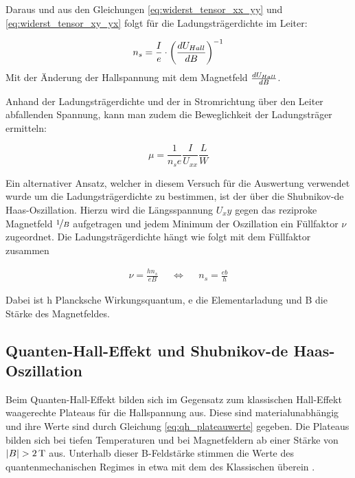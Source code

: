 Daraus und aus den Gleichungen \ref{eq:widerst_tensor_xx_yy} und \ref{eq:widerst_tensor_xy_yx} folgt für die Ladungsträgerdichte im Leiter:
 
 \begin{equation}
 n_s=\frac{I}{e} \cdot \left( \frac{d U_{Hall}}{d B} \right)^{-1}
 \label{eq:ladungsdichte_steig}
 \end{equation}
 Mit der Änderung der Hallspannung mit dem Magnetfeld $\frac{d U_{Hall}}{d B}$. 
 
 Anhand der Ladungsträgerdichte und der in Stromrichtung über den Leiter abfallenden Spannung, kann man zudem die Beweglichkeit der Ladungsträger ermitteln:
 
 \begin{equation}
 \mu=\frac{1}{n_se}\frac{I}{U_{xx}}\frac{L}{W}
 \label{eq:bewegl_masse}
 \end{equation}
 
 Ein alternativer Ansatz, welcher in diesem Versuch für die Auswertung verwendet wurde um die Ladungsträgerdichte zu bestimmen, ist der über die Shubnikov-de Haas-Oszillation. Hierzu wird die Längsspannung $U_xy$ gegen das reziproke Magnetfeld $\nicefrac{1}{B}$ aufgetragen und jedem Minimum der Oszillation ein Füllfaktor $\nu$ zugeordnet. Die Ladungsträgerdichte hängt wie folgt mit dem Füllfaktor zusammen
 
 \begin{align}
 	\nu = \frac{hn_s}{eB} & & \Leftrightarrow & & n_s = \frac{eb}{h}
 	\label{eq:sdh_osz_naeherung}
 \end{align}
 
 Dabei ist h Plancksche Wirkungsquantum, e die Elementarladung und B die Stärke des Magnetfeldes. 
 
 
 

\newpage
\subsection{Quanten-Hall-Effekt und Shubnikov-de Haas-Oszillation}

Beim Quanten-Hall-Effekt bilden sich im Gegensatz zum klassischen Hall-Effekt waagerechte Plateaus für die Hallspannung aus. Diese sind materialunabhängig und ihre Werte sind durch Gleichung \ref{eq:qh_plateauwerte} gegeben. Die Plateaus bilden sich bei tiefen Temperaturen und bei Magnetfeldern ab einer Stärke von $|B| > \unit[2]{T}$ aus. Unterhalb dieser B-Feldstärke stimmen die Werte des quantenmechanischen Regimes in etwa mit dem des Klassischen überein \cite[Kap.3.6]{kopitzki_einfuhrung_2009}.

